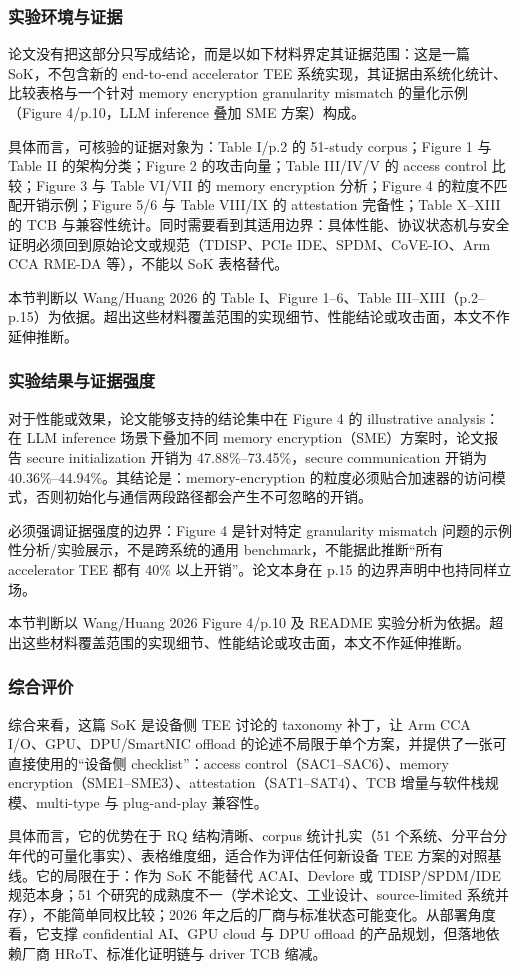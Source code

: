 \documentclass[11pt]{ctexart}
\begin{document}
\subsubsection{实验环境与证据}
论文没有把这部分只写成结论，而是以如下材料界定其证据范围：这是一篇 SoK，不包含新的 end-to-end accelerator TEE 系统实现，其证据由系统化统计、比较表格与一个针对 memory encryption granularity mismatch 的量化示例（Figure 4/p.10，LLM inference 叠加 SME 方案）构成。\par
具体而言，可核验的证据对象为：Table I/p.2 的 51-study corpus；Figure 1 与 Table II 的架构分类；Figure 2 的攻击向量；Table III/IV/V 的 access control 比较；Figure 3 与 Table VI/VII 的 memory encryption 分析；Figure 4 的粒度不匹配开销示例；Figure 5/6 与 Table VIII/IX 的 attestation 完备性；Table X--XIII 的 TCB 与兼容性统计。同时需要看到其适用边界：具体性能、协议状态机与安全证明必须回到原始论文或规范（TDISP、PCIe IDE、SPDM、CoVE-IO、Arm CCA RME-DA 等），不能以 SoK 表格替代。\par
本节判断以 Wang/Huang 2026 的 Table I、Figure 1--6、Table III--XIII（p.2--p.15）为依据。超出这些材料覆盖范围的实现细节、性能结论或攻击面，本文不作延伸推断。\par
\subsubsection{实验结果与证据强度}
对于性能或效果，论文能够支持的结论集中在 Figure 4 的 illustrative analysis：在 LLM inference 场景下叠加不同 memory encryption（SME）方案时，论文报告 secure initialization 开销为 47.88\%--73.45\%，secure communication 开销为 40.36\%--44.94\%。其结论是：memory-encryption 的粒度必须贴合加速器的访问模式，否则初始化与通信两段路径都会产生不可忽略的开销。\par
必须强调证据强度的边界：Figure 4 是针对特定 granularity mismatch 问题的示例性分析/实验展示，不是跨系统的通用 benchmark，不能据此推断``所有 accelerator TEE 都有 40\% 以上开销''。论文本身在 p.15 的边界声明中也持同样立场。\par
本节判断以 Wang/Huang 2026 Figure 4/p.10 及 README 实验分析为依据。超出这些材料覆盖范围的实现细节、性能结论或攻击面，本文不作延伸推断。\par
\subsubsection{综合评价}
综合来看，这篇 SoK 是设备侧 TEE 讨论的 taxonomy 补丁，让 Arm CCA I/O、GPU、DPU/SmartNIC  offload 的论述不局限于单个方案，并提供了一张可直接使用的``设备侧 checklist''：access control（SAC1--SAC6）、memory encryption（SME1--SME3）、attestation（SAT1--SAT4）、TCB 增量与软件栈规模、multi-type 与 plug-and-play 兼容性。\par
具体而言，它的优势在于 RQ 结构清晰、corpus 统计扎实（51 个系统、分平台分年代的可量化事实）、表格维度细，适合作为评估任何新设备 TEE 方案的对照基线。它的局限在于：作为 SoK 不能替代 ACAI、Devlore 或 TDISP/SPDM/IDE 规范本身；51 个研究的成熟度不一（学术论文、工业设计、source-limited 系统并存），不能简单同权比较；2026 年之后的厂商与标准状态可能变化。从部署角度看，它支撑 confidential AI、GPU cloud 与 DPU offload 的产品规划，但落地依赖厂商 HRoT、标准化证明链与 driver TCB 缩减。\par
\end{document}
